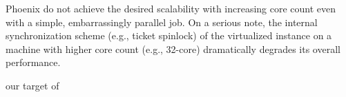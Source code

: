 Phoenix do not achieve the desired scalability with increasing core count 
even with a simple, embarrassingly parallel job.
On a serious note, the internal
synchronization scheme (e.g., ticket spinlock) of
the virtualized instance on a machine with higher core count (e.g.,
32-core) dramatically degrades its overall performance.

{\color{red}our target of \myds}




